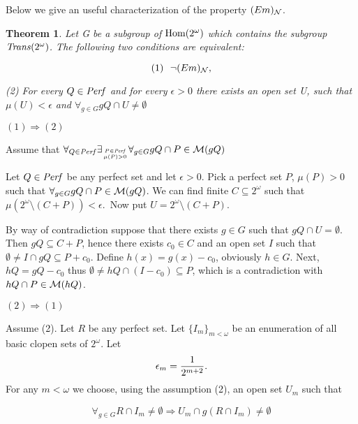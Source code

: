 \documentclass[b5cutpaper, twoside, 11pt, leqno]{moravica}
\newcommand{\eps}{\epsilon}
\newcommand\trans{{\it Trans}(\ca)}
\newcommand\ooo{\underline{O}}
\newcommand{\seq}{\subseteq}
\newcommand{\ca}{2^{\omega}}
\newcommand{\mgr}{{\cal M}}
\newcommand{\neglig}{{\cal N}}
\newcommand{\perf}{{\it Perf}}
\newcommand{\cantor}{\ca}
\newcommand\Hom{{\rm Hom(\ca)}}
\newtheorem{theorem}{Theorem}[section]
\theoremstyle{definition}
\begin{document}
 
  Below we give an useful characterization of the
property $(Em)_{\neglig}$.

\medskip

\begin{theorem}
Let G be a subgroup of $\Hom$ which contains the
subgroup $\trans$. The following two conditions are
equivalent:

\[ (1)\ \ \neg (Em)_{\neglig}, \]

\par (2) For every $Q \in \perf$
and for every $\eps > 0$ there exists an open
set U, such that
$\mu(U) < \eps$
and $\forall_{g \in G} gQ \cap U \not = \emptyset$
\end{theorem}

\proof

$(1) \Rightarrow (2)$
\par
Assume that
$\forall_{Q \in \perf} \exists_{P \in \perf \atop \mu(P) > 0}
\forall_{g \in G} gQ \cap P \in \mgr(gQ)$

Let $Q \in \perf$ be any perfect set and let $\eps > 0$.
Pick a perfect set $P$, $\mu(P) > 0$ such
that $\forall_{g \in G} gQ \cap P \in \mgr(gQ)$.
We can find finite $C \seq \cantor$ such that
$\mu(\cantor \setminus (C+P)) < \eps$.\
Now put $U = \cantor \setminus (C+P)$.

By way of contradiction suppose that
there exists $g \in G$ such that
$gQ \cap U = \emptyset$.
Then $gQ \seq C + P$, hence
there exists $c_0 \in C$ and an open set $I$
such that $\emptyset \not = I \cap gQ \seq P + c_0$.
  Define $h(x) = g(x) - c_0$, obviously $h \in G$.
Next, $hQ = gQ - c_0$ thus
$\emptyset \not = hQ \cap (I - c_0) \seq P$,
which is a contradiction with
$hQ \cap P \in \mgr(hQ)$.


\medskip

$(2) \Rightarrow (1)$

Assume (2). Let $R$ be any perfect
set. Let $\{ I_m \} _{m < \omega}$
be an enumeration of all basic clopen sets of $\cantor$.
Let
  \[\eps_{m} = {1 \over 2^{m + 2}}.\]
For any $m < \omega$
we choose, using the assumption (2),
an open set $U_{m}$ such that

\[
\forall_{g\in G} R \cap I_m \not = \emptyset
\Rightarrow U_{m} \cap g(R \cap I_m) \not = \emptyset
\]
\end{document}
